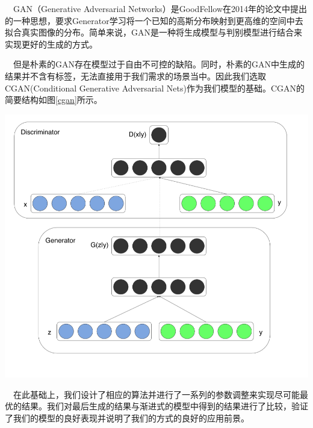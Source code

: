 \documentclass[portrait]{a0poster}
\begin{document}
\begin{multicols}{2}
\begin{CJK}{UTF8}{gbsn}
\ \ GAN\supercite{NIPS2014_5423}（Generative Adversarial Networks）是GoodFellow在2014年的论文中提出的一种思想，要求Generator学习将一个已知的高斯分布映射到更高维的空间中去拟合真实图像的分布。简单来说，GAN是一种将生成模型与判别模型进行结合来实现更好的生成的方式。


\ \ 但是朴素的GAN存在模型过于自由不可控的缺陷。同时，朴素的GAN中生成的结果并不含有标签，无法直接用于我们需求的场景当中。因此我们选取CGAN\supercite{DBLP:journals/corr/MirzaO14}(Conditional Generative Adversarial Nets)作为我们模型的基础。CGAN的简要结构如图\ref{cgan}所示。

\begin{center}\vspace{1cm}
\includegraphics[width=0.8\linewidth]{CGAN.png}
\label{cgan}
\end{center}\vspace{1cm}

\ \ 在此基础上，我们设计了相应的算法并进行了一系列的参数调整来实现尽可能最优的结果。我们对最后生成的结果与渐进式的模型中得到的结果进行了比较，验证了我们的模型的良好表现并说明了我们的方式的良好的应用前景。


\end{CJK}
\end{multicols}
\end{document}
